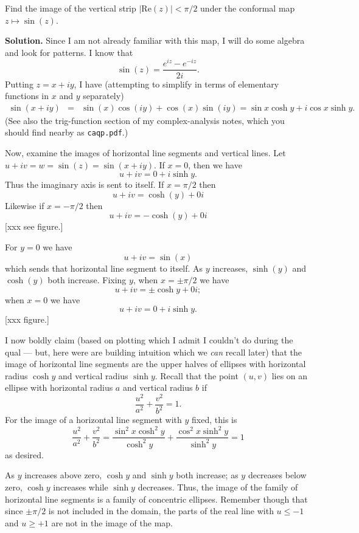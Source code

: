\documentclass[10pt]{article}
\numberwithin{equation}{subsection}
\begin{document}
Find the image of the vertical strip $|\mathrm{Re}(z)| < \pi/2$ under the
conformal map $z \mapsto \sin(z)$.

\textbf{Solution.}  Since I am not already familiar with this map, I will do
some algebra and look for patterns.  I know that
$$
	\sin(z) = \frac{e^{iz}-e^{-iz}}{2i}.
$$
Putting $z=x+iy$, I have (attempting to simplify in terms of elementary
functions in $x$ and $y$ separately)
\begin{eqnarray*}
	\sin(x+iy) &=& \sin(x)\cos(iy) + \cos(x) \sin(iy)
		= \sin x \cosh y + i \cos x \sinh y.
\end{eqnarray*}
(See also the trig-function section of my complex-analysis notes, which you
should find nearby as \texttt{caqp.pdf}.)

Now, examine the images of horizontal line segments and vertical lines.  Let
$u+iv = w = \sin(z) = \sin(x+iy)$.  If $x=0$, then we have
$$
	u+iv = 0 + i \sinh y.
$$
Thus the imaginary axis is sent to itself.  If $x = \pi/2$ then
$$
	u+iv = \cosh(y) + 0i
$$
Likewise if $x=-\pi/2$ then
$$
	u+iv = -\cosh(y) + 0i
$$
[xxx see figure.]

For $y=0$ we have
$$
	u+iv = \sin(x)
$$
which sends that horizontal line segment to itself.  As $y$ increases,
$\sinh(y)$ and $\cosh(y)$ both increase.  Fixing $y$, when
$x=\pm\pi/2$ we have
$$
	u+iv = \pm\cosh y + 0i;
$$
when $x=0$ we have
$$
	u+iv = 0 + i\sinh y.
$$
[xxx figure.]

I now boldly claim (based on plotting which I admit I couldn't do during the
qual --- but, here were are building intuition which we \emph{can} recall
later) that the image of horizontal line segments are the upper halves of
ellipses with horizontal radius $\cosh y$ and vertical radius $\sinh y$.
Recall that the point $(u,v)$ lies on an ellipse with horizontal
radius $a$ and vertical radius $b$ if
$$
	\frac{u^2}{a^2} + \frac{v^2}{b^2} = 1.
$$
For the image of a horizontal line segment with $y$ fixed, this is
$$
	\frac{u^2}{a^2} + \frac{v^2}{b^2} =
	\frac{\sin^2 x \cosh^2 y}{\cosh^2 y} + \frac{\cos^2 x \sinh^2 y}{\sinh^2 y}
	= 1
$$
as desired.

As $y$ increases above zero, $\cosh y$ and $\sinh y$ both increase; as $y$
decreases below zero, $\cosh y$ increases while $\sinh y$ decreases.  Thus, the
image of the family of horizontal line segments is a family of concentric
ellipses.  Remember though that since $\pm\pi/2$ is not included in the domain,
the parts of the real line with $u\le -1$ and $u \ge +1$ are not in the image
of the map.
\end{document}
